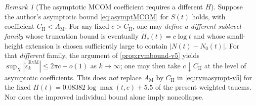 \documentclass[11pt,a4paper]{article}
\numberwithin{equation}{section}
\theoremstyle{definition}
\theoremstyle{remark}
\newtheorem{remark}[theorem]{Remark}
\begin{document}
\begin{remark}[The asymptotic MCOM coefficient requires a different $H$]
Suppose the author's asymptotic bound \eqref{eq:asymptMCOM} for $S(t)$ holds, with coefficient
$C_{\mathrm H}<A_{\mathrm M}$.  For any fixed $c>C_{\mathrm H}$,
one may \emph{define a different sublevel family} whose truncation
bound is eventually $\widetilde H_c(t)=c\log t$ and whose
small-height extension is chosen sufficiently large to contain
$|N(t)-N_0(t)|$.  For that \emph{different} family, the argument of
\cref{prop:rvmbound-v5} yields
$\sup_X|\widetilde\varepsilon_k^{\mathrm{RvM}}|
\le2\pi c+o(1)$ as $k\to\infty$; one may then take
$c\downarrow C_{\mathrm H}$ at the level of asymptotic coefficients.
This does \emph{not} replace $A_{\mathrm M}$ by
$C_{\mathrm H}$ in \eqref{eq:rvmasympt-v5} for the fixed
$H(t)=0.08382\log\max(t,e)+5.5$ of the present weighted taucms.
Nor does the improved individual bound alone imply noncollapse.
\end{remark}
\end{document}
